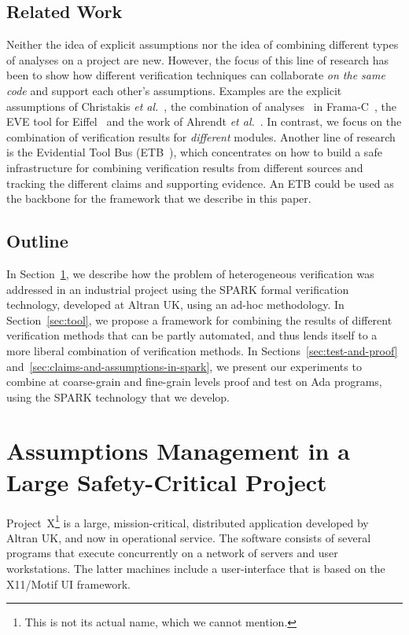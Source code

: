 \documentclass{llncs}
\newcommand{\spark}{SPARK\xspace}
\newcommand{\projectx}{Project~X\xspace}
\newcommand{\etal}{\textit{et al.}\xspace}
\begin{document}
\subsection{Related Work}

Neither the idea of explicit assumptions nor the
idea of combining different types of analyses on a project are new. However,
the focus of this line of research has been to show how different verification
techniques can collaborate {\em on the same code} and support each other's
assumptions. Examples are the explicit assumptions of Christakis
\etal~\cite{mullerexplicit}, the combination of analyses~\cite{framaccombining}
in Frama-C~\cite{framac}, the EVE tool for
Eiffel~\cite{tschannen2011usable} and the work of Ahrendt
\etal~\cite{ahrendt2012unified}. In contrast, we focus on the combination of
verification results for {\em different} modules. Another line of research is
the Evidential Tool Bus (ETB~\cite{cruanes2013tool}), which concentrates
on how to build a safe infrastructure for combining verification results from different sources and
tracking the different claims and supporting evidence. An ETB could be used as
the backbone for the framework that we describe in this paper.

\subsection{Outline}

In Section~\ref{sec:traditional}, we describe how the problem of heterogeneous
verification was addressed in an industrial project using the \spark formal
verification technology, developed at Altran UK, using an ad-hoc
methodology. In Section~\ref{sec:tool}, we propose a framework for combining
the results of different verification methods that can be partly automated, and
thus lends itself to a more liberal combination of verification methods. In
Sections~\ref{sec:test-and-proof}
and~\ref{sec:claims-and-assumptions-in-spark}, we present our experiments to
combine at coarse-grain and fine-grain levels proof and test on Ada programs,
using the \spark technology that we develop.

\section{Assumptions Management in a Large Safety-Critical Project}
\label{sec:traditional}

\projectx\footnote{This is not its actual name, which we cannot mention.} is a
large, mission-critical, distributed application developed by Altran UK, and
now in operational service.  The software consists of several programs that
execute concurrently on a network of servers and user workstations.  The latter
machines include a user-interface that is based on the X11/Motif UI framework.
\end{document}
